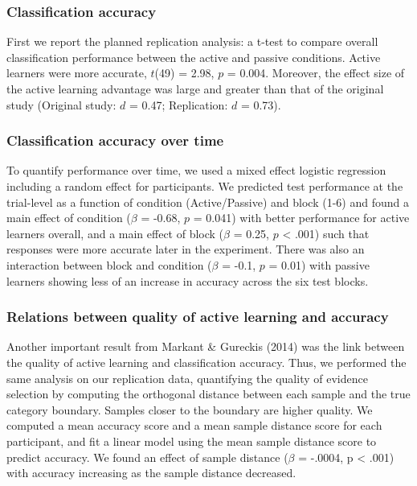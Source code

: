\documentclass[10pt, letterpaper]{article}
\begin{document}
\subsubsection{Classification accuracy}\label{classification-accuracy}

First we report the planned replication analysis: a t-test to compare
overall classification performance between the active and passive
conditions. Active learners were more accurate, \(t\)(49) = 2.98, \(p\)
= 0.004. Moreover, the effect size of the active learning advantage was
large and greater than that of the original study (Original study: \(d\)
= 0.47; Replication: \(d\) = 0.73).

\subsubsection{Classification accuracy over
time}\label{classification-accuracy-over-time}

To quantify performance over time, we used a mixed effect logistic
regression including a random effect for participants. We predicted test
performance at the trial-level as a function of condition
(Active/Passive) and block (1-6) and found a main effect of condition
(\(\beta\) = -0.68, \(p\) = 0.041) with better performance for active
learners overall, and a main effect of block (\(\beta\) = 0.25, \(p\)
\textless{} .001) such that responses were more accurate later in the
experiment. There was also an interaction between block and condition
(\(\beta\) = -0.1, \(p\) = 0.01) with passive learners showing less of
an increase in accuracy across the six test blocks.

\subsubsection{Relations between quality of active learning and
accuracy}\label{relations-between-quality-of-active-learning-and-accuracy}

Another important result from Markant \& Gureckis (2014) was the link
between the quality of active learning and classification accuracy.
Thus, we performed the same analysis on our replication data,
quantifying the quality of evidence selection by computing the
orthogonal distance between each sample and the true category boundary.
Samples closer to the boundary are higher quality. We computed a mean
accuracy score and a mean sample distance score for each participant,
and fit a linear model using the mean sample distance score to predict
accuracy. We found an effect of sample distance (\(\beta\) = -.0004, p
\textless{} .001) with accuracy increasing as the sample distance
decreased.
\end{document}
